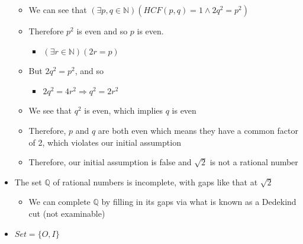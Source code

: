 \documentclass{article}
\begin{document}
\begin{itemize}
\begin{itemize}
\begin{itemize}
        \end{itemize}
        \item We can see that $(\exists p,q \in \mathbb{N}) \left( HCF(p,q) = 1 \wedge 2q^2 = p^2 \right)$
        \item Therefore $p^2$ is even and so $p$ is even.
        \begin{itemize}
            \item $(\exists r \in \mathbb{N})(2r=p)$
        \end{itemize}
        \item But $2q^2=p^2$, and so
        \begin{itemize}
            \item $2q^2=4r^2 \Rightarrow q^2 = 2r^2$
        \end{itemize}
        \item We see that $q^2$ is even, which implies $q$ is even
        \item Therefore, $p$ and $q$ are both even which means they have a common factor of 2, which violates our initial assumption
        \item Therefore, our initial assumption is false and $\sqrt{2}$ is not a rational number
    \end{itemize}
    \item The set $\mathbb{Q}$ of rational numbers is incomplete, with gaps like that at $\sqrt{2}$
    \begin{itemize}
        \item We can complete $\mathbb{Q}$ by filling in its gaps via what is known as a Dedekind cut (not examinable)
    \end{itemize}
    \item $Set = \{ O, I\}$
\end{itemize}
\end{document}
